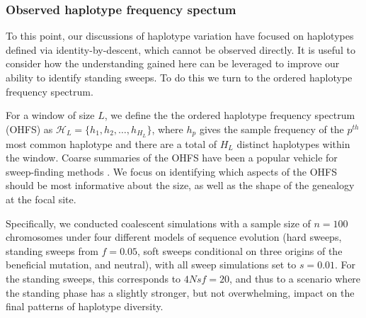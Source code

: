 \documentclass[a4paper,10pt]{article}
\begin{document}
\subsubsection*{Observed haplotype frequency spectum}

To this point, our discussions of haplotype variation have focused on haplotypes defined via identity-by-descent, which cannot be observed directly. It is useful to consider how the understanding gained here can be leveraged to improve our ability to identify standing sweeps. To do this we turn to the ordered haplotype frequency spectrum.




For a window of size $L$, we define the the ordered haplotype frequency spectrum (OHFS) as $\mathcal{H}_L = \{h_1,h_2,\dots,h_{H_{L}}\}$, where $h_p$ gives the sample frequency of the $p^{th}$ most common haplotype and there are a total of $H_{L}$ distinct haplotypes within the window. Coarse summaries of the OHFS have been a popular vehicle for sweep-finding methods \cite[e.g. EHH, iHS and H12:][]{Sabeti:2002ge,Voight:2006go,Garud:2015jy}. We focus on identifying which aspects of the OHFS should be most informative about the size, as well as the shape of the genealogy at the focal site.

Specifically, we conducted coalescent simulations with a sample size of $n=100$ chromosomes under four different models of sequence evolution (hard sweeps, standing sweeps from $f=0.05$, soft sweeps conditional on three origins of the beneficial mutation, and neutral), with all sweep simulations set to $s=0.01$. For the standing sweeps, this corresponds to $4Nsf = 20$, and thus to a scenario where the standing phase has a slightly stronger, but not overwhelming, impact on the final patterns of haplotype diversity.
\end{document}

